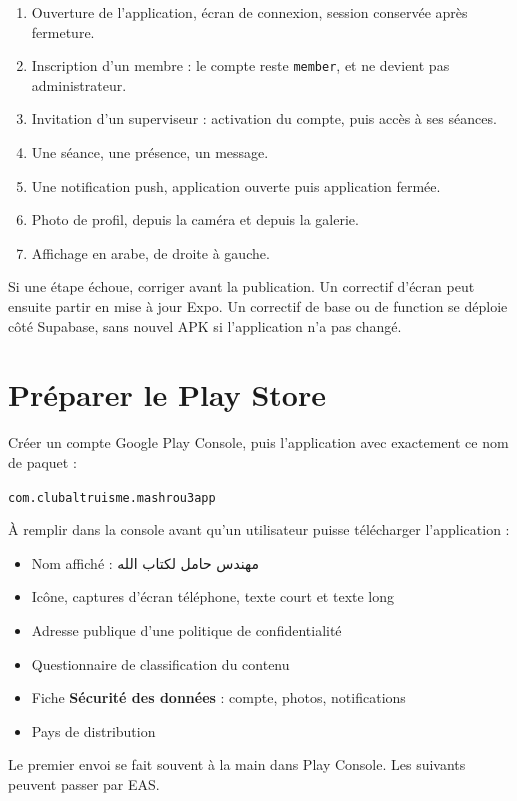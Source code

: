 \documentclass[11pt,a4paper]{article}
\newcommand{\code}[1]{\texttt{#1}}
\newcommand{\pkg}{\code{com.clubaltruisme.mashrou3app}}
\begin{document}
\begin{enumerate}
  \item Ouverture de l'application, écran de connexion, session conservée après fermeture.
  \item Inscription d'un membre : le compte reste \code{member}, et ne devient pas administrateur.
  \item Invitation d'un superviseur : activation du compte, puis accès à ses séances.
  \item Une séance, une présence, un message.
  \item Une notification push, application ouverte puis application fermée.
  \item Photo de profil, depuis la caméra et depuis la galerie.
  \item Affichage en arabe, de droite à gauche.
\end{enumerate}

Si une étape échoue, corriger avant la publication. Un correctif d'écran peut ensuite partir en mise à jour Expo. Un correctif de base ou de function se déploie côté Supabase, sans nouvel APK si l'application n'a pas changé.

\section{Préparer le Play Store}

Créer un compte Google Play Console, puis l'application avec exactement ce nom de paquet :

\begin{center}
\pkg
\end{center}

À remplir dans la console avant qu'un utilisateur puisse télécharger l'application :

\begin{itemize}
  \item Nom affiché : مهندس حامل لكتاب الله
  \item Icône, captures d'écran téléphone, texte court et texte long
  \item Adresse publique d'une politique de confidentialité
  \item Questionnaire de classification du contenu
  \item Fiche \textbf{Sécurité des données} : compte, photos, notifications
  \item Pays de distribution
\end{itemize}

Le premier envoi se fait souvent à la main dans Play Console. Les suivants peuvent passer par EAS.
\end{document}
